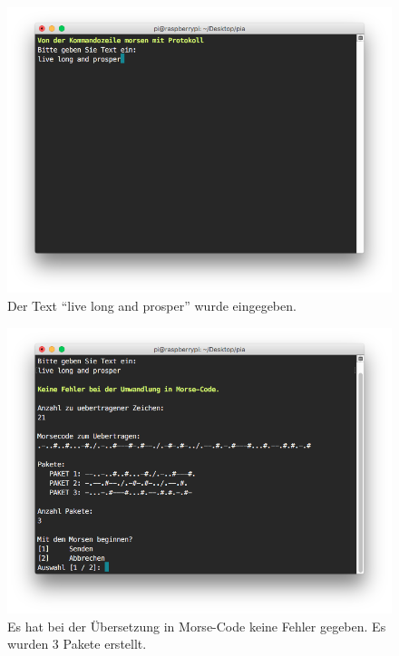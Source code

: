 \documentclass[12pt, a4paper]{article}
\begin{document}
\newpage
\begin{figure}[H]
	\centering
	\includegraphics[width=1.0\textwidth]{sshot_5.png}
	\caption{Der Text \enquote{live long and prosper} wurde eingegeben.}
\end{figure}

\newpage
\begin{figure}[H]
	\centering
	\includegraphics[width=1.0\textwidth]{sshot_6.png}
	\caption{Es hat bei der Übersetzung in Morse-Code keine Fehler gegeben. Es wurden 3 Pakete erstellt.}
\end{figure}
\end{document}
